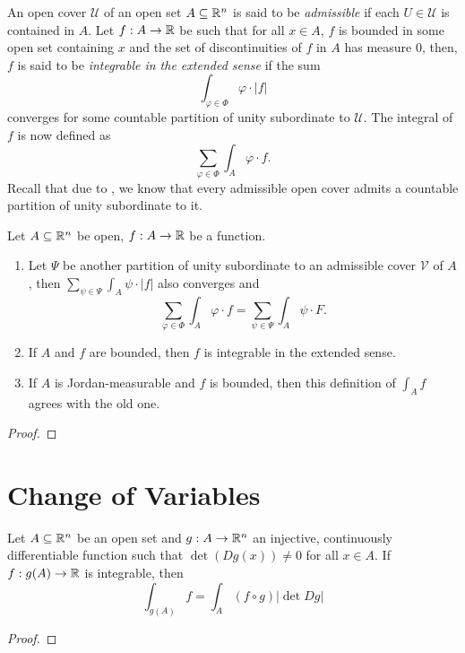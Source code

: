 \begin{definition}
    An open cover $\mathscr U$ of an open set $A\subseteq\mathbb{R}^n$ is said to be \emph{admissible} if each $U\in\mathscr U$ is contained in $A$. Let $f: A\to\mathbb{R}$ be such that for all $x\in A$, $f$ is bounded in some open set containing $x$ and the set of discontinuities of $f$ in $A$ has measure $0$, then, $f$ is said to be \emph{integrable in the extended sense} if the sum 
    \begin{equation*}
        \int_{\varphi\in\Phi}\varphi\cdot|f|
    \end{equation*}
    converges for some countable partition of unity subordinate to $\mathscr U$. The integral of $f$ is now defined as 
    \begin{equation*}
        \sum_{\varphi\in\Phi}\int_A\varphi\cdot f.
    \end{equation*} 
    Recall that due to , we know that every admissible open cover admits a countable partition of unity subordinate to it.
\end{definition}

\begin{theorem}
    Let $A\subseteq\mathbb{R}^n$ be open, $f: A\to\mathbb{R}$ be a function.
    \begin{enumerate}[label=(\alph*)]
        \item Let $\Psi$ be another partition of unity subordinate to an admissible cover $\mathscr V$ of $A$, then $\displaystyle\sum_{\psi\in\Psi}\int_A\psi\cdot|f|$ also converges and 
        \begin{equation*}
            \sum_{\varphi\in\Phi}\int_A \varphi\cdot f = \sum_{\psi\in\Psi}\int_A\psi\cdot F.
        \end{equation*}

        \item If $A$ and $f$ are bounded, then $f$ is integrable in the extended sense. 

        \item If $A$ is Jordan-measurable and $f$ is bounded, then this definition of $\int_A f$ agrees with the old one.
    \end{enumerate}
\end{theorem}
\begin{proof}
    
\end{proof}

\section{Change of Variables}

\begin{theorem}
    Let $A\subseteq\mathbb{R}^n$ be an open set and $g: A\to\mathbb{R}^n$ an injective, continuously differentiable function such that $\det(Dg(x))\ne0$ for all $x\in A$. If $f: g(A)\to\mathbb{R}$ is integrable, then 
    \begin{equation*}
        \int_{g(A)} f = \int_A (f\circ g)|\det Dg|
    \end{equation*}
\end{theorem}
\begin{proof}
\end{proof}